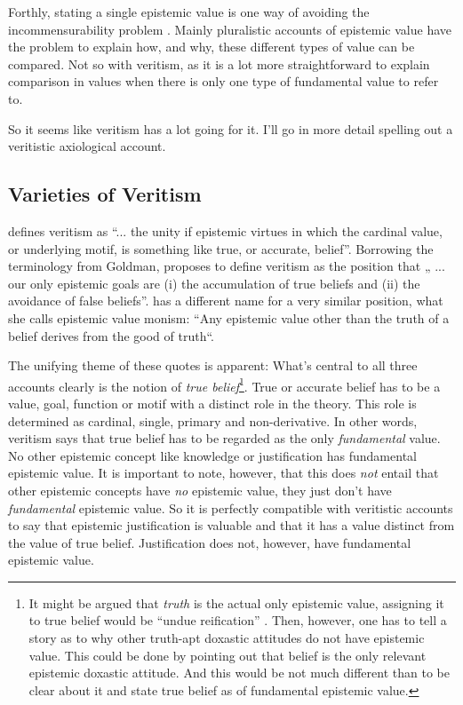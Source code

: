 \documentclass[12pt,numbers=noenddot]{scrartcl}
\begin{document}
Forthly, stating a single epistemic value is one way of avoiding the incommensurability problem \autocite[16]{sep-value-theory}. Mainly pluralistic accounts of epistemic value have the problem to explain how, and why, these different types of value can be compared. Not so with veritism, as it is a lot more straightforward to explain comparison in values when there is only one type of fundamental value to refer to.

So it seems like veritism has a lot going for it. I'll go in more detail spelling out a veritistic axiological account.

\subsection{Varieties of Veritism}\label{sec:varieties}

\textcite[54]{Goldman2002-GOLTUO-2} defines veritism as  “... the unity if epistemic virtues in which the cardinal value, or underlying motif, is something like true, or accurate, belief”. Borrowing the terminology from Goldman, \textcite[360]{Berker2013-BERETA-2} proposes to define veritism as the position that „ ... our only epistemic goals are (i) the accumulation of true beliefs and (ii) the avoidance of false beliefs”. \textcite{Zagzebski2004-ZAGEVM-2} has a different name for a very similar position, what she calls epistemic value monism: “Any epistemic value other than the truth of a belief derives from the good of truth“. 

The unifying theme of these quotes is apparent: What’s central to all three accounts clearly is the notion of \emph{true belief}\footnote{It might be argued that \emph{truth} is the actual only epistemic value, assigning it to true belief would be “undue reification” \autocite{Pritchard2014}. Then, however, one has to tell a story as to why other truth-apt doxastic attitudes do not have epistemic value. This could be done by pointing out that belief is the only relevant epistemic doxastic attitude. And this would be not much different than to be clear about it and state true belief as of fundamental epistemic value.}. True or accurate belief has to be a value, goal, function or motif with a distinct role in the theory. This role is determined as cardinal, single, primary and non-derivative. In other words, veritism says that true belief has to be regarded as the only \emph{fundamental} value. No other epistemic concept like knowledge or justification has fundamental epistemic value. It is important to note, however, that this does \emph{not} entail that other epistemic concepts have \emph{no} epistemic value, they just don’t have \emph{fundamental} epistemic value. So it is perfectly compatible with veritistic accounts to say that epistemic justification is valuable and that it has a value distinct from the value of true belief. Justification does not, however, have fundamental epistemic value.
\end{document}
